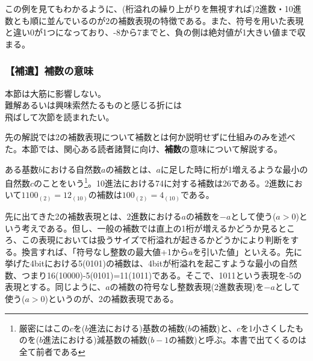 この例を見てもわかるように、(桁溢れの繰り上がりを無視すれば)2進数・10進数とも順に並んでいるのが2の補数表現の特徴である。また、符号を用いた表現と違い0が1つになっており、-8から7までと、負の側は絶対値が1大きい値まで収まる。

\subsubsection{【補遺】補数の意味}
\begin{center}
\begin{minipage}[]{0.75\linewidth}
\begin{screen}
\begin{center}
本節は大筋に影響しない。\\
難解あるいは興味索然たるものと感じる折には\\
飛ばして次節を読まれたい。
\end{center}
\end{screen}
\end{minipage}
\end{center}

先の解説では2の補数表現について補数とは何か説明せずに仕組みのみを述べた。本節では、関心ある読者諸賢に向け、\textbf{補数}の意味について解説する。

ある基数$b$における自然数$a$の補数とは、$a$に足した時に桁が1増えるような最小の自然数$c$のことをいう\footnote{厳密にはこの$c$を($b$進法における)基数の補数($b$の補数)と、$c$を1小さくしたものを($b$進法における)減基数の補数($b-1$の補数)と呼ぶ。本書で出てくるのは全て前者である}。10進法における74に対する補数は26である。2進数において$1100_{(2)}=12_{(10)}$の補数は$100_{(2)}=4_{(10)}$である。

先に出てきた2の補数表現とは、2進数における$a$の補数を$-a$として使う($a>0$)という考えである。但し、一般の補数では直上の1桁が増えるかどうか見るところ、この表現においては扱うサイズで桁溢れが起きるかどうかにより判断をする。換言すれば、「符号なし整数の最大値+1から$a$を引いた値」といえる。先に挙げた4bitにおける5(0101)の補数は、4bitが桁溢れを起こすような最小の自然数、つまり16(10000)-5(0101)=11(1011)である。そこで、1011という表現を-5の表現とする。同じように、$a$の補数の符号なし整数表現(2進数表現)を$-a$として使う($a>0$)というのが、2の補数表現である。


